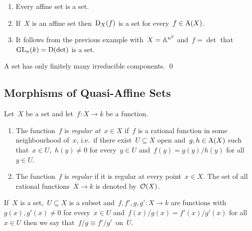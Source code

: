 \begin{example}
  \leavevmode
  \begin{enumerate}
    \item
      Every affine set is a {\qaffine} set.
    \item
      If~$X$ is an affine set then~$\operatorname{D}_X(f)$ is a {\qaffine} set for every~$f \in \operatorname{A}(X)$.
    \item
      It follows from the previous example with~$X = \mathbb{A}^{n^2}$ and~$f = \det$ that~$\operatorname{GL}_n(k) = \operatorname{D}(\operatorname{det})$ is a {\qaffine} set.
  \end{enumerate}
\end{example}


\begin{lemma}
\label{quasi-affine have only finitely many irreducible}
  A {\qaffine} set has only finitely many irreducible components.
  \qed
\end{lemma}





\subsection{Morphisms of Quasi-Affine Sets}


\begin{definition}
  \label{regular for quasiaffine}
  Let~$X$ be a {\qaffine} set and let~$f \colon X \to k$ be a function.
  \begin{enumerate}
    \item
      The function~$f$ is \emph{regular at~$x \in X$} if~$f$ is a rational function in some neighbourhood of~$x$, i.e.\ if there exist~$U \subseteq X$ open and~$g, h \in \operatorname{A}(X)$ such that~$x \in U$,~$h(y) \neq 0$ for every~$y \in U$ and~$f(y) = g(y)/h(y)$ for all~$y \in U$.
    \item
      The function~$f$ is \emph{regular} if it is regular at every point~$x \in X$.
      The set of all rational functions~$X \to k$ is denoted by~$\mathcal{O}(X)$.
  \end{enumerate}
\end{definition}


\begin{notation}
  If~$X$ is a set,~$U \subseteq X$ is a subset and~$f, f', g, g' \colon X \to k$ are functions with~$g(x), g'(x) \neq 0$ for every~$x \in U$ and~$f(x)/g(x) = f'(x)/g'(x)$ for all~$x \in U$ then we say that~$f/g \equiv f'/g'$~on~$U$.
\end{notation}


